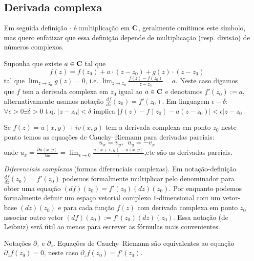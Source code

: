 \subsection{Derivada complexa}
Em seguida definição $\cdot$ é multiplicação em $\mathbf{C}$,
geralmente omitimos este símbolo, mas quero enfatizar que essa definição depende
de multiplicação (resp. divisão) de números complexos.
\begin{defin}
Suponha que existe $a\in \mathbf{C}$ tal que
$$ f(z) = f(z_0) + a \cdot (z-z_0) + g(z) \cdot (z-z_0) $$
tal que $\lim_{z\to z_0} g(z) = 0$,
i.e. $\lim_{z\to z_0} \frac{f(z)-f(z_0)}{z-z_0} = a$.
Neste caso digamos que $f$ tem a derivada complexa em $z_0$ igual ao $a\in \mathbf{C}$
e denotamos $f'(z_0) := a$, alternativamente usamos notação $\frac{df}{dz}(z_0) = f'(z_0)$.
Em linguagem $\epsilon-\delta$:
$\forall\epsilon>0\exists\delta>0$ t.q. $|z-z_0|<\delta$ implica
$|f(z)-f(z_0)-a(z-z_0)| < \epsilon |z-z_0|$.
\end{defin}

\begin{lema}
Se $f(z) = u(x,y) + iv(x,y)$ tem a derivada complexa em ponto $z_0$ neste ponto temos as equações de Cauchy--Riemann
para derivadas parciais: 
\begin{equation}
u_x = v_y, \,\,\, u_y = - v_x
\end{equation}
onde $u_x = \frac{\partial u(x,y)}{\partial x} = \lim_{\epsilon\to 0} \frac{u(x+\epsilon,y)-u(x,y)}{\epsilon}$,etc
são as derivadas parciais.
\end{lema}

\emph{Diferenciais complexas} (formas diferenciais complexas).
Em notação-definição $\frac{df}{dz}(z_0) = f'(z_0)$ podemos formalmente multiplicar pelo denominador para obter
uma equação $(df)(z_0) = f'(z_0) (dz)(z_0)$.
Por enquanto podemos formalmente definir um espaço vetorial complexo $1$-dimensional com um vetor-base $(dz)(z_0)$ e para cada função $f(z)$ com derivada complexa em ponto $z_0$ associar outro vetor $(df)(z_0) := f'(z_0) (dz)(z_0)$. Essa notação (de Leibniz)
será útil ao menos para escrever as fórmulas mais convenientes.

Notações $\partial_z$ e $\partial_{\bar{z}}$.
Equações de Cauchy--Riemann são equivalentes ao equação $\partial_{\bar{z}} f(z_0) = 0$,
neste caso $\partial_z f(z_0) = f'(z_0)$.

